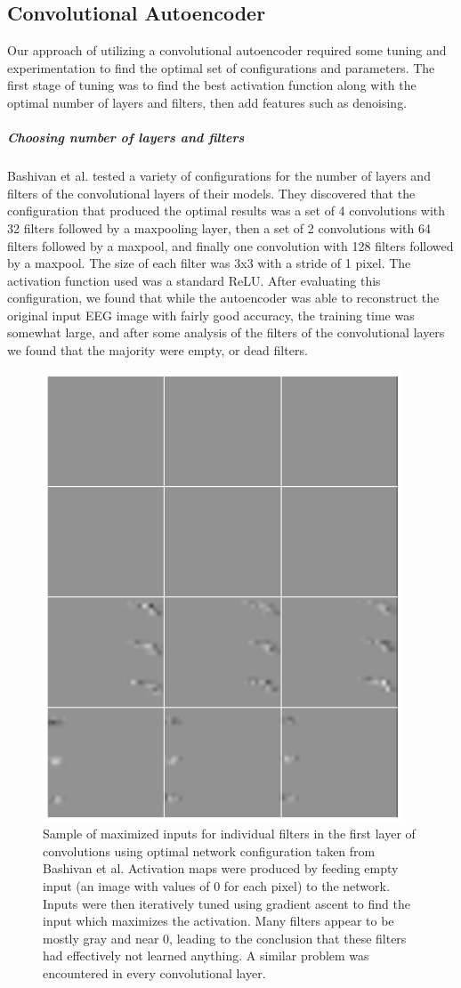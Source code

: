 \documentclass{article}
\begin{document}
\subsection{Convolutional Autoencoder}
Our approach of utilizing a convolutional autoencoder required some tuning and experimentation to find the optimal set of configurations and parameters. The first stage of tuning was to find the best activation function along with the optimal number of layers and filters, then add features such as denoising.
\subparagraph{Choosing number of layers and filters}
Bashivan et al. tested a variety of configurations for the number of layers and filters of the convolutional layers of their models. They discovered that the configuration that produced the optimal results was a set of 4 convolutions with 32 filters followed by a maxpooling layer, then a set of 2 convolutions with 64 filters followed by a maxpool, and finally one convolution with 128 filters followed by a maxpool. The size of each filter was 3x3 with a stride of 1 pixel. The activation function used was a standard ReLU. After evaluating this configuration, we found that while the autoencoder was able to reconstruct the original input EEG image with fairly good accuracy, the training time was somewhat large, and after some analysis of the filters of the convolutional layers we found that the majority were empty, or dead filters. 
\begin{figure}[!ht]
	\centering
    \includegraphics[scale=0.6]{inputs_orig}
    \caption{Sample of maximized inputs for individual filters in the first layer of convolutions using optimal network configuration taken from Bashivan et al. Activation maps were produced by feeding empty input (an image with values of 0 for each pixel) to the network. Inputs were then iteratively tuned using gradient ascent to find the input which maximizes the activation. Many filters appear to be mostly gray and near 0, leading to the conclusion that these filters had effectively not learned anything. A similar problem was encountered in every convolutional layer.}
\end{figure}
\end{document}
